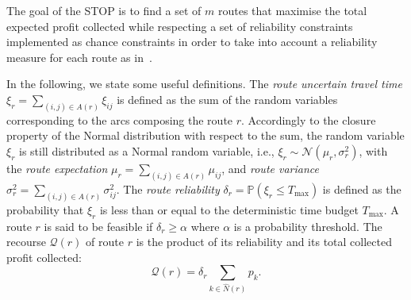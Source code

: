 \documentclass[11pt]{article}
\theoremstyle{definition}
\begin{document}
The goal of the STOP is to find a set of $m$ routes that maximise the total expected profit collected while respecting a set of reliability constraints implemented as chance constraints in order to take into account a reliability measure for each route as in~\citet{Thayer2021}.

In the following, we state some useful definitions. The \emph{route uncertain travel time} $\xi_r = \sum_{(i,j) \in A(r)} \xi_{ij}$ is defined as the sum of the random variables corresponding to the arcs composing the route $r$. Accordingly to the closure property of the Normal distribution with respect to the sum, the random variable $\xi_r$ is still distributed as a Normal random variable, i.e.,  $\xi_r \sim \mathcal{N}(\mu_r, \sigma^2_r)$, with the \emph{route expectation} $\mu_r =\sum_{(i,j) \in A(r)} \mu_{ij}$, and \emph{route variance} $\sigma^2_r = \sum_{(i,j) \in A(r)} \sigma^2_{ij}$.
%
%
%
The \emph{route reliability} $\delta_r = \mathbb{P}(\xi_r \leq T_{\max})$ is defined as the probability that $\xi_r$ is less than or equal to the deterministic time budget $T_{\max}$. A route $r$ is said to be feasible if $\delta_r \geq \alpha$ where $\alpha$ is a probability threshold.
The recourse $\mathcal{Q}(r)$ of route $r$ is the product of its reliability and its total collected profit collected:
%
\begin{equation}
\label{route_recourse}
\mathcal{Q}(r) = \delta_r \sum_{k \in \hat{N}(r)} p_k.
\end{equation}
%
\end{document}
